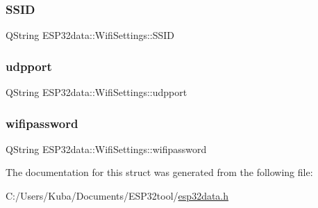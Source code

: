 \subsubsection{\texorpdfstring{S\+S\+ID}{SSID}}
{\footnotesize\ttfamily Q\+String E\+S\+P32data\+::\+Wifi\+Settings\+::\+S\+S\+ID}

\mbox{\label{struct_e_s_p32data_1_1_wifi_settings_a32dc462ab6495a371a9916689f6c5bbb}} 
\subsubsection{\texorpdfstring{udpport}{udpport}}
{\footnotesize\ttfamily Q\+String E\+S\+P32data\+::\+Wifi\+Settings\+::udpport}

\mbox{\label{struct_e_s_p32data_1_1_wifi_settings_a38dce639f92290ff219e29d822b4b62c}} 
\subsubsection{\texorpdfstring{wifipassword}{wifipassword}}
{\footnotesize\ttfamily Q\+String E\+S\+P32data\+::\+Wifi\+Settings\+::wifipassword}



The documentation for this struct was generated from the following file\+:\begin{DoxyCompactItemize}
\item 
C\+:/\+Users/\+Kuba/\+Documents/\+E\+S\+P32tool/\hyperlink{esp32data_8h}{esp32data.\+h}\end{DoxyCompactItemize}
